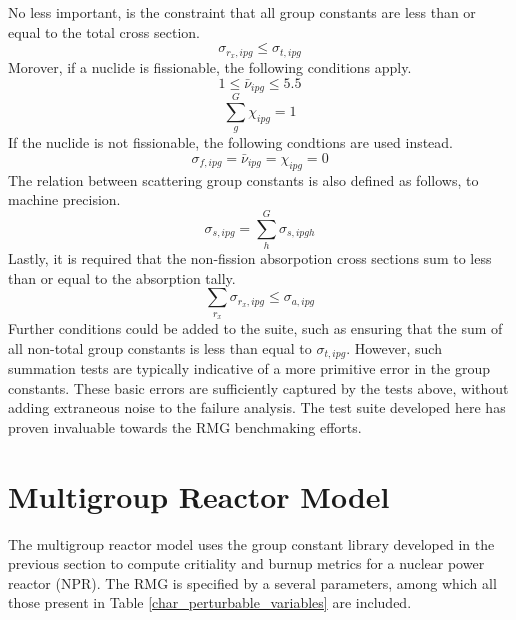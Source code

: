 No less important, is the constraint that all group constants are less than or equal to 
the total cross section.
\begin{equation}
\label{tot_xs_ut}
\sigma_{r_x,ipg} \le \sigma_{t,ipg}
\end{equation}
Morover, if a nuclide is fissionable, the following conditions apply.
\begin{equation}
\label{nu_fiss_ut}
1 \le \bar{\nu}_{ipg} \le 5.5
\end{equation}
\begin{equation}
\label{chi_fiss_ut}
\sum_g^G \chi_{ipg} = 1
\end{equation}
If the nuclide is not fissionable, the following condtions are used instead.
\begin{equation}
\label{not_fiss_ut}
\sigma_{f,ipg} = \bar{\nu}_{ipg} = \chi_{ipg} = 0
\end{equation}
The relation between scattering group constants is also defined as follows, to 
machine precision.
\begin{equation}
\label{scat_xs_ut}
\sigma_{s,ipg} = \sum_h^G \sigma_{s,ipgh}
\end{equation}
Lastly, it is required that the non-fission absorpotion cross sections sum 
to less than or equal to the absorption tally.
\begin{equation}
\label{scat_xs_ut}
\sum_{r_x} \sigma_{r_x,ipg} \le \sigma_{a,ipg}
\end{equation}
Further conditions could be added to the suite, such as ensuring that the sum of 
all non-total group constants is less than equal to $\sigma_{t,ipg}$.  However, 
such summation tests are typically indicative of a more primitive error in the 
group constants.  These basic errors are sufficiently captured by the tests above, 
without adding extraneous noise to the failure analysis.  The test suite developed
here has proven invaluable towards the RMG benchmaking efforts.




\section{Multigroup Reactor Model}
\label{mg_sec:rmg_model}
The multigroup reactor model uses the group constant library developed in the previous 
section to compute critiality and burnup metrics for a nuclear power reactor (NPR).
The RMG is specified by a several parameters, among which all those present in Table
\ref{char_perturbable_variables} are included.

